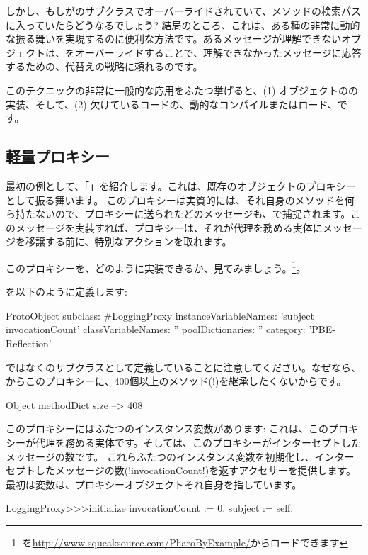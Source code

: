 \documentclass[a4paper,10pt,twoside]{book}
\begin{document}
しかし、もしがのサブクラスでオーバーライドされていて、メソッドの検索パスに入っていたらどうなるでしょう?
結局のところ、これは、ある種の非常に動的な振る舞いを実現するのに便利な方法です。あるメッセージが理解できないオブジェクトは、をオーバーライドすることで、理解できなかったメッセージに応答するための、代替えの戦略に頼れるのです。

このテクニックの非常に一般的な応用をふたつ挙げると、(1) オブジェクトのの実装、そして、(2) 欠けているコードの、動的なコンパイルまたはロード、です。

\subsection{軽量プロキシー}

最初の例として、「」を紹介します。これは、既存のオブジェクトのプロキシーとして振る舞います。
このプロキシーは実質的には、それ自身のメソッドを何ら持たないので、プロキシーに送られたどのメッセージも、で捕捉されます。このメッセージを実装すれば、プロキシーは、それが代理を務める実体にメッセージを移譲する前に、特別なアクションを取れます。

このプロキシーを、どのように実装できるか、見てみましょう。\footnote{を\url{http://www.squeaksource.com/PharoByExample/}からロードできます}。

を以下のように定義します:
\begin{code}{}
ProtoObject subclass: #LoggingProxy
	instanceVariableNames: 'subject invocationCount'
	classVariableNames: ''
	poolDictionaries: ''
	category: 'PBE-Reflection'
\end{code}
ではなくのサブクラスとして定義していることに注意してください。なぜなら、からこのプロキシーに、400個以上のメソッド(!)を継承したくないからです。

\begin{code}{}
Object methodDict size --> 408
\end{code}

このプロキシーにはふたつのインスタンス変数があります:  これは、このプロキシーが代理を務める実体です。そしては、このプロキシーがインターセプトしたメッセージの数です。 %
これらふたつのインスタンス変数を初期化し、インターセプトしたメッセージの数(\ct!invocationCount!)を返すアクセサーを提供します。
最初は変数は、プロキシーオブジェクトそれ自身を指しています。
\begin{code}{}
LoggingProxy>>>initialize
	invocationCount := 0.
	subject := self.
\end{code}
\end{document}
